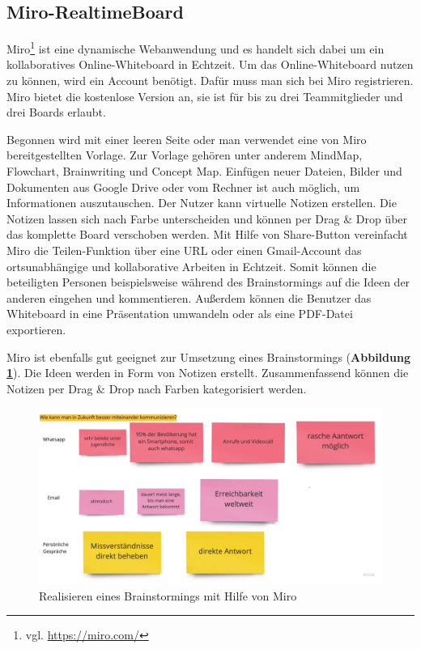 \subsection{Miro-RealtimeBoard}
\label{sec:miro-realtimeBoard}
Miro\footnote{vgl. \url{https://miro.com/}} ist eine dynamische Webanwendung und es handelt sich dabei um ein kollaboratives Online-Whiteboard in Echtzeit. Um das Online-Whiteboard nutzen zu können, wird ein Account benötigt. Dafür muss man sich bei Miro registrieren. Miro bietet die kostenlose Version an, sie ist für bis zu drei Teammitglieder und drei Boards erlaubt.\bigskip

Begonnen wird mit einer leeren Seite oder man verwendet eine von Miro bereitgestellten Vorlage. Zur Vorlage gehören unter anderem MindMap, Flowchart, Brainwriting und Concept Map. Einfügen neuer Dateien, Bilder und Dokumenten aus Google Drive oder vom Rechner ist auch möglich, um Informationen auszutauschen. Der Nutzer kann virtuelle Notizen erstellen. Die Notizen lassen sich nach Farbe unterscheiden und können per Drag \& Drop über das komplette Board verschoben werden. Mit Hilfe von Share-Button vereinfacht Miro die Teilen-Funktion über eine URL oder einen Gmail-Account das ortsunabhängige und kollaborative Arbeiten in Echtzeit. Somit können die beteiligten Personen beispielsweise während des Brainstormings auf die Ideen der anderen eingehen und kommentieren. Außerdem können die Benutzer das Whiteboard in eine Präsentation umwandeln oder als eine PDF-Datei exportieren.\bigskip

Miro ist ebenfalls gut geeignet zur Umsetzung eines Brainstormings (\textbf{Abbildung \ref{fig:miro board}}). Die Ideen werden in Form von Notizen erstellt. Zusammenfassend können die Notizen per Drag \& Drop nach Farben kategorisiert werden.  

\begin{figure}[H]
  \begin{center}
    \includegraphics[scale=0.25]{img/miro1}
	\caption{Realisieren eines Brainstormings mit Hilfe von Miro} 
	\label{fig:miro board}
  \end{center}   
\end{figure}

